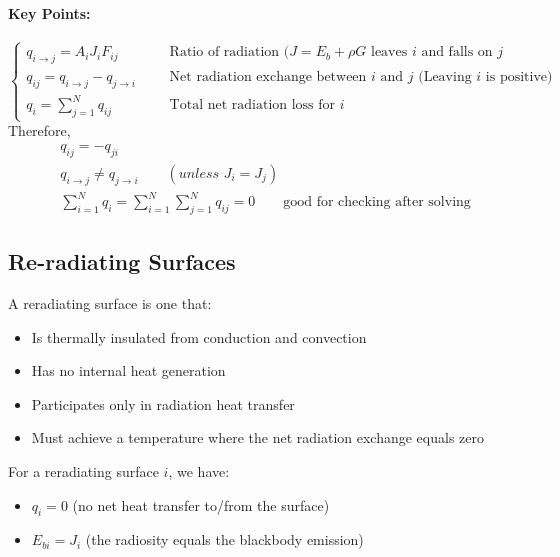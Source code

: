 \paragraph{Key Points:}
\[
        \left\{\begin{array}{lccl}
            q_{i \to j} = A_{i}J_{i}F_{ij} &  &&\text {Ratio of radiation ($J=E_b + \rho G$ leaves $i$ and falls on $j$} 
            \\[1em]
            q_{ij} = q_{i \to j} - q_{j \to i}&&& \text{Net radiation exchange between $i$ and $j$ (Leaving $i$ is positive)}
            \\[1em]
            q_i=\sum_{j=1}^N q_{i j} &&& \text {Total net radiation loss for $i$}
        \end{array}
        \right.
\]
Therefore,
\[
\boxed{
    \begin{aligned}
        &q_{ij} = - q_{ji}
        \\[1em]
        &q_{i \to j} \neq q_{j \to i} \qquad(\textit{unless $J_i = J_j$})
        \\[1em]
        &\sum_{i=1}^N q_i = \sum_{i=1}^N\sum_{j=1}^N q_{ij}= 0 \qquad \text{good for checking after solving}
    \end{aligned}
    }
\]

\subsection*{Re-radiating Surfaces}

A reradiating surface is one that:
\begin{itemize}
    \item Is thermally insulated from conduction and convection
    \item Has no internal heat generation
    \item Participates only in radiation heat transfer
    \item Must achieve a temperature where the net radiation exchange equals zero
\end{itemize}

For a reradiating surface $i$, we have:
\begin{itemize}
    \item $q_i = 0$ (no net heat transfer to/from the surface)
    \item $E_{bi} = J_i$ (the radiosity equals the blackbody emission)
\end{itemize}

